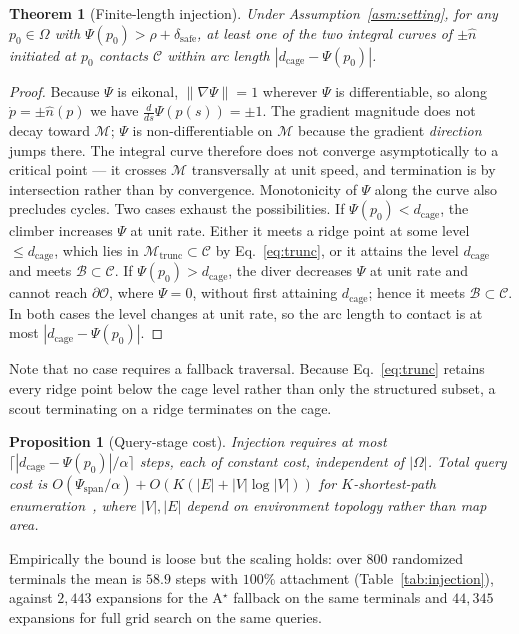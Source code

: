 \documentclass[conference]{IEEEtran}
\newtheorem{theorem}{Theorem}
\newtheorem{proposition}{Proposition}
\begin{document}
\begin{theorem}[Finite-length injection]
\label{thm:injection}
Under Assumption~\ref{asm:setting}, for any $p_0\in\Omega$ with $\Psi(p_0)>\rho+\delta_{\mathrm{safe}}$, at least one of the two integral curves of $\pm\hat{n}$ initiated at $p_0$ contacts $\mathcal{C}$ within arc length $|d_{\mathrm{cage}}-\Psi(p_0)|$.
\end{theorem}
\begin{proof}
Because $\Psi$ is eikonal, $\|\nabla\Psi\|=1$ wherever $\Psi$ is differentiable, so along $\dot{p}=\pm\hat{n}(p)$ we have $\tfrac{d}{ds}\Psi(p(s))=\pm 1$. The gradient magnitude does not decay toward $\mathcal{M}$; $\Psi$ is non-differentiable on $\mathcal{M}$ because the gradient \emph{direction} jumps there. The integral curve therefore does not converge asymptotically to a critical point --- it crosses $\mathcal{M}$ transversally at unit speed, and termination is by intersection rather than by convergence. Monotonicity of $\Psi$ along the curve also precludes cycles.
Two cases exhaust the possibilities. If $\Psi(p_0)<d_{\mathrm{cage}}$, the climber increases $\Psi$ at unit rate. Either it meets a ridge point at some level $\le d_{\mathrm{cage}}$, which lies in $\mathcal{M}_{\mathrm{trunc}}\subset\mathcal{C}$ by Eq.~\eqref{eq:trunc}, or it attains the level $d_{\mathrm{cage}}$ and meets $\mathcal{B}\subset\mathcal{C}$. If $\Psi(p_0)>d_{\mathrm{cage}}$, the diver decreases $\Psi$ at unit rate and cannot reach $\partial\mathcal{O}$, where $\Psi=0$, without first attaining $d_{\mathrm{cage}}$; hence it meets $\mathcal{B}\subset\mathcal{C}$. In both cases the level changes at unit rate, so the arc length to contact is at most $|d_{\mathrm{cage}}-\Psi(p_0)|$.
\end{proof}
Note that no case requires a fallback traversal. Because Eq.~\eqref{eq:trunc} retains every ridge point below the cage level rather than only the structured subset, a scout terminating on a ridge terminates on the cage.
\begin{proposition}[Query-stage cost]
Injection requires at most $\lceil |d_{\mathrm{cage}}-\Psi(p_0)|/\alpha \rceil$ steps, each of constant cost, independent of $|\Omega|$. Total query cost is $O(\Psi_{\text{span}}/\alpha) + O(K(|E|+|V|\log|V|))$ for $K$-shortest-path enumeration~\cite{yen1971}, where $|V|,|E|$ depend on environment topology rather than map area.
\end{proposition}
Empirically the bound is loose but the scaling holds: over $800$ randomized terminals the mean is $58.9$ steps with $100\%$ attachment (Table~\ref{tab:injection}), against $2{,}443$ expansions for the A$^\star$ fallback on the same terminals and $44{,}345$ expansions for full grid search on the same queries.
\end{document}
